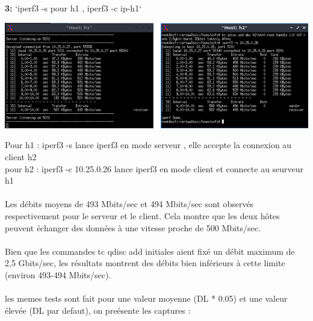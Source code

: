 \vspace{1cm}
\textbf{3:} `iperf3 -s pour h1 , iperf3 -c ip-h1`
\begin{center}
    \includegraphics[width=1\textwidth]{./images/2smaller.png}
\end{center}
Pour h1 : iperf3 -s lance iperf3 en mode serveur , elle accepte la connexion au client h2\\
pour h2 : iperf3 -c 10.25.0.26 lance iperf3 en mode client et connecte au seurveur h1
\\
\\Les débits moyens de 493 Mbits/sec et 494 Mbits/sec sont observés respectivement pour le serveur et le client. Cela montre que les deux hôtes peuvent échanger des données à une vitesse proche de 500 Mbits/sec.
\\
\\Bien que les commandes tc qdisc add initiales aient fixé un débit maximum de 2,5 Gbits/sec, les résultats montrent des débits bien inférieurs à cette limite (environ 493-494 Mbits/sec).
\\ 
\\les memes tests sont fait pour une valeur moyenne (DL * 0.05) et une valeur élevée (DL par defaut), on preésente les captures : 

